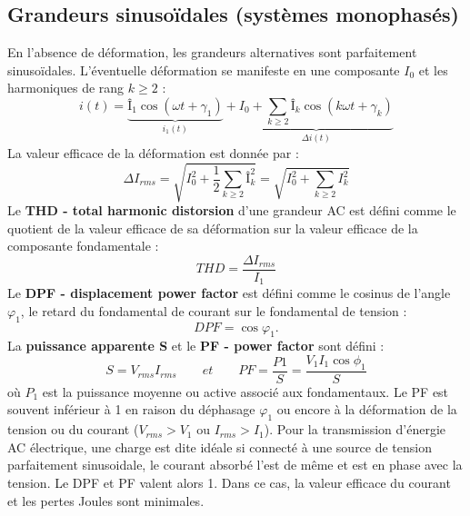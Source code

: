 	\subsection{Grandeurs sinusoïdales (systèmes monophasés)}
		En l'absence de déformation, les grandeurs alternatives sont parfaitement sinusoïdales. L'éventuelle déformation se manifeste en une composante $I_0$ et les harmoniques de rang $k\geq 2$ :
		\begin{equation}
			i(t) = \underbrace{Î_1\cos (\omega t+\gamma _1)}_{i_1(t)} + \underbrace{I_0 + \sum _ {k\geq 2} Î_k \cos (k\omega t + \gamma _k)}_{\Delta i(t)}
		\end{equation}
		La valeur efficace de la déformation est donnée par : 
		\begin{equation}
			\Delta I_{rms} = \sqrt{I_0^2+\frac{1}{2}\sum _{k\geq 2} Î_k^2} = \sqrt{I_0^2+ \sum _{k\geq 2} I_k^2}
		\end{equation}
		Le \textbf{THD - total harmonic distorsion} d'une grandeur AC est défini comme le quotient de la valeur efficace de sa déformation sur la valeur efficace de la composante fondamentale :
		\begin{equation}
			THD = \frac{\Delta I_{rms}}{I_1}
		\end{equation}
		Le \textbf{DPF - displacement power factor} est défini comme le cosinus de l'angle $\varphi _1$, le retard du fondamental de courant sur le fondamental de tension : 
		\begin{equation}
			DPF = \cos \varphi _1.
		\end{equation}
		La \textbf{puissance apparente S} et le \textbf{PF - power factor} sont défini :
		\begin{equation}
			S = V_{rms}I_{rms} \qquad et \qquad PF = \frac{P1}{S} = \frac{V_1I_1\cos \phi _1}{S}
		\end{equation}
		où $P_1$ est la puissance moyenne ou active associé aux fondamentaux. Le PF est souvent inférieur à 1 en raison du déphasage $\varphi _1$ ou encore à la déformation de la tension ou du courant ($V_{rms}>V_1$ ou $I_{rms}>I_1$). Pour la transmission d'énergie AC électrique, une charge est dite idéale si connecté à une source de tension parfaitement sinusoidale, le courant absorbé l'est de même et est en phase avec la tension. Le DPF et PF valent alors 1. Dans ce cas, la valeur efficace du courant et les pertes Joules sont minimales. 
		
